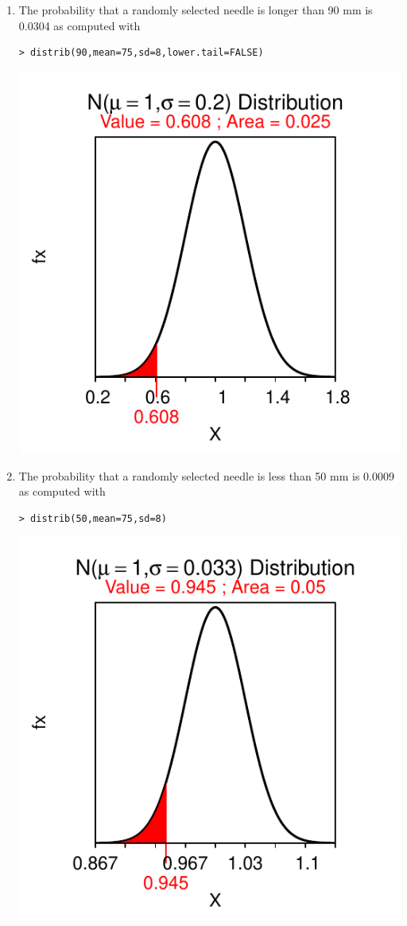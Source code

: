 \documentclass[10pt,openany]{book}\usepackage[]{graphicx}\usepackage[]{color}
\makeatletter
\newenvironment{kframe}{%
 \def\at@end@of@kframe{}%
 \ifinner\ifhmode%
  \def\at@end@of@kframe{\end{minipage}}%
  \begin{minipage}{\columnwidth}%
 \fi\fi%
 \def\FrameCommand##1{\hskip\@totalleftmargin \hskip-\fboxsep
 \colorbox{shadecolor}{##1}\hskip-\fboxsep
     \hskip-\linewidth \hskip-\@totalleftmargin \hskip\columnwidth}%
 \MakeFramed {\advance\hsize-\width
   \@totalleftmargin\z@ \linewidth\hsize
   \@setminipage}}%
 {\par\unskip\endMakeFramed%
 \at@end@of@kframe}
\newenvironment{knitrout}{}{} %
\makeatother
\begin{document}
\begin{itemize}
\begin{enumerate}
\begin{knitrout}
{}



\end{knitrout}
    \item The probability that a randomly selected needle is longer than 90 mm is 0.0304 as computed with
\begin{knitrout}
\color{fgcolor}\begin{kframe}
\begin{verbatim}
> distrib(90,mean=75,sd=8,lower.tail=FALSE)
\end{verbatim}
\end{kframe}

{\centering \includegraphics[width=.4\linewidth]{Figs/unnamed-chunk-305-1} 

}



\end{knitrout}
    \item The probability that a randomly selected needle is less than 50 mm is 0.0009 as computed with
\begin{knitrout}
\color{fgcolor}\begin{kframe}
\begin{verbatim}
> distrib(50,mean=75,sd=8)
\end{verbatim}
\end{kframe}

{\centering \includegraphics[width=.4\linewidth]{Figs/unnamed-chunk-306-1} 

}



\end{knitrout}
  \end{enumerate}

\end{itemize}
\end{document}
